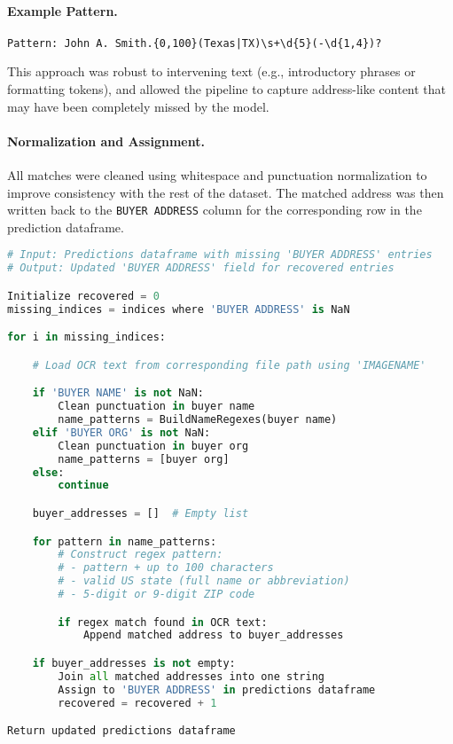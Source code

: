 \documentclass{article}
\begin{document}
\paragraph{Example Pattern.}
\begin{verbatim}
Pattern: John A. Smith.{0,100}(Texas|TX)\s+\d{5}(-\d{1,4})?
\end{verbatim}

This approach was robust to intervening text (e.g., introductory phrases or formatting tokens), and allowed the pipeline to capture address-like content that may have been completely missed by the model. \\

\paragraph{Normalization and Assignment.}
All matches were cleaned using whitespace and punctuation normalization to improve consistency with the rest of the dataset. The matched address was then written back to the \texttt{BUYER ADDRESS} column for the corresponding row in the prediction dataframe. 

\vspace{16mm} 

\begin{lstlisting}[language=Python, caption=Post-Hoc Buyer Address Recovery via Regex Anchored on Buyer Name or Organization]
# Input: Predictions dataframe with missing 'BUYER ADDRESS' entries
# Output: Updated 'BUYER ADDRESS' field for recovered entries

Initialize recovered = 0
missing_indices = indices where 'BUYER ADDRESS' is NaN

for i in missing_indices:

    # Load OCR text from corresponding file path using 'IMAGENAME'

    if 'BUYER NAME' is not NaN:
        Clean punctuation in buyer name
        name_patterns = BuildNameRegexes(buyer name)
    elif 'BUYER ORG' is not NaN:
        Clean punctuation in buyer org
        name_patterns = [buyer org]
    else:
        continue

    buyer_addresses = []  # Empty list

    for pattern in name_patterns:
        # Construct regex pattern:
        # - pattern + up to 100 characters
        # - valid US state (full name or abbreviation)
        # - 5-digit or 9-digit ZIP code

        if regex match found in OCR text:
            Append matched address to buyer_addresses

    if buyer_addresses is not empty:
        Join all matched addresses into one string
        Assign to 'BUYER ADDRESS' in predictions dataframe
        recovered = recovered + 1

Return updated predictions dataframe
\end{lstlisting}
\end{document}
